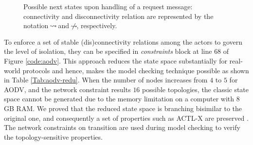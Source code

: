 \begin{figure}
   	\caption{Possible next states upon handling of a request message: connectivity and disconnectivity relation are represented by the notation $\!\rightsquigarrow\! $ and $\!\mathrel{\hspace{.1em}\not\hspace{-.1em}\rightsquigarrow}\!$, respectively.}\label{Fig::reduction}
\end{figure}

To enforce a set of stable (dis)connectivity relations among the actors to govern the level of isolation, they can be specified in \emph{constraints} block at line $68$ of Figure \ref{code:aodv}. This approach reduces the state space substantially for real-world protocols and hence, makes the model checking technique possible as shown in Table \ref{Tab:aodv-redu}. When the number of nodes increases from $4$ to $5$ for AODV, and the network constraint results $16$ possible topologies, the classic state space cannot be generated due to the memory limitation on a computer with $8${GB} {RAM}.  We proved that the reduced state space is branching bisimilar to the
original one, and consequently a set of properties such as {ACTL-X} are preserved \cite{FOAC}. The network constraints on transition are used during model checking \cite{FORM,CSI2018} to verify the topology-sensitive properties. 

